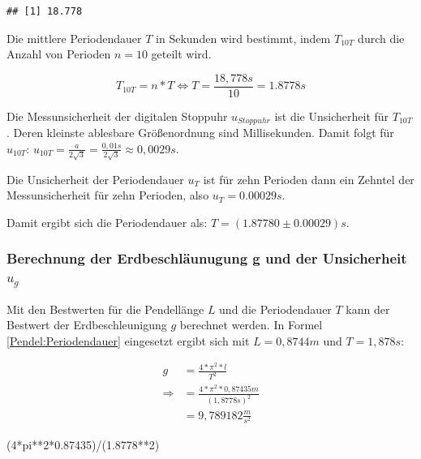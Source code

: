 \documentclass[
  9pt,
]{article}
\newenvironment{Shaded}{\begin{snugshade}}{\end{snugshade}}
\newcommand{\DecValTok}[1]{\textcolor[rgb]{0.00,0.00,0.81}{#1}}
\newcommand{\FloatTok}[1]{\textcolor[rgb]{0.00,0.00,0.81}{#1}}
\newcommand{\NormalTok}[1]{#1}
\newcommand{\SpecialCharTok}[1]{\textcolor[rgb]{0.00,0.00,0.00}{#1}}
\begin{document}
\begin{verbatim}
## [1] 18.778
\end{verbatim}

Die mittlere Periodendauer \(T\) in Sekunden wird bestimmt, indem
\(T_{10T}\) durch die Anzahl von Perioden \(n=10\) geteilt wird.

\[T_{10T} = n*T \Leftrightarrow T = \frac{18,778s}{10}=1.8778s\]

Die Messunsicherheit der digitalen Stoppuhr \(u_{Stoppuhr}\) ist die
Unsicherheit für \(T_{10T}\). Deren kleinste ablesbare Größenordnung
sind Millisekunden. Damit folgt für \(u_{10T}\):
\(u_{10T}= \frac{a}{2\sqrt{3}} = \frac{0,01s}{2\sqrt{3}} \approx 0,0029s\).

Die Unsicherheit der Periodendauer \(u_T\) ist für zehn Perioden dann
ein Zehntel der Messunsicherheit für zehn Perioden, also
\(u_T=0.00029s\).

Damit ergibt sich die Periodendauer als: \(T=(1.87780 \pm 0.00029)s\).

\hypertarget{berechnung-der-erdbeschluxe4unugung-g-und-der-unsicherheit-u_g}{%
\subsubsection{\texorpdfstring{Berechnung der Erdbeschläunugung g und
der Unsicherheit
\(u_g\)}{Berechnung der Erdbeschläunugung g und der Unsicherheit u\_g}}\label{berechnung-der-erdbeschluxe4unugung-g-und-der-unsicherheit-u_g}}

Mit den Bestwerten für die Pendellänge \(L\) und die Periodendauer \(T\)
kann der Bestwert der Erdbeschleunigung \(g\) berechnet werden. In
Formel \ref{Pendel:Periodendauer} eingesetzt ergibt sich mit
\(L = 0,8744m\) und \(T = 1,878s\):

\begin{equation*}
\begin{split}
g&=\frac{4*\pi^2*l}{T^2}\\
\Rightarrow &=\frac{4*\pi^2*0,87435m}{(1,8778s)^2}\\
 &= 9,789182 \frac{m}{s^2} 
\end{split}
\end{equation*}

\begin{Shaded}
\begin{Highlighting}[]
\NormalTok{(}\DecValTok{4}\SpecialCharTok{*}\NormalTok{pi}\SpecialCharTok{**}\DecValTok{2}\SpecialCharTok{*}\FloatTok{0.87435}\NormalTok{)}\SpecialCharTok{/}\NormalTok{(}\FloatTok{1.8778}\SpecialCharTok{**}\DecValTok{2}\NormalTok{)}
\end{Highlighting}
\end{Shaded}
\end{document}
